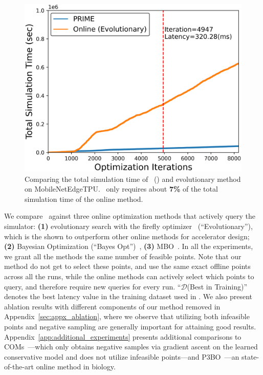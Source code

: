 \begin{figure}
    \centering
    \vspace{-0.45cm}
    \includegraphics[width=0.98\linewidth]{chapters/prime/figs/motivation/simulation_time.png}
    \vspace{-0.3cm}
    \caption{\footnotesize{Comparing the total simulation time of \primemethodname\ () and evolutionary method on MobileNetEdgeTPU. \primemethodname\ only requires about \textbf{7\%} of the total simulation time of the online method.}}
    \vspace{-0.35cm}
    \label{fig:convergence_time}
\end{figure}
%
We compare \primemethodname\ against three online optimization methods that actively query the simulator: \textbf{(1)} evolutionary search with the firefly optimizer~\citep{yazdanbakhsh2021apollo} (``Evolutionary''), which is the shown to outperform other online methods for accelerator design; \textbf{(2)} Bayesian Optimization (``Bayes Opt'')~\citep{vizier:sigkdd:2017},
\textbf{(3)} MBO~\citep{angermueller2019model}. 
%
%
In all the experiments, we grant all the methods the same number of feasible points. Note that our method do not get to select these points, and use the same exact offline points across all the runs, while the online methods can actively select which points to query, and therefore require new queries for every run. 
%
``$\mathcal{D}$(Best in Training)'' denotes the best latency value in the training dataset used in \primemethodname. We also present ablation results with different components of our method removed in Appendix~\ref{sec:appx_ablation}, where we observe that utilizing both infeasible points and negative sampling are generally important for attaining good results. 
%
Appendix~\ref{app:additional_experiments} presents additional comparisons to COMs~\citep{trabucco2021conservative}---which only obtains negative samples via gradient ascent on the learned conservative model and does not utilize infeasible points---and P3BO~\citep{p3bo:arxiv:2020}---an state-of-the-art online method in biology. 

